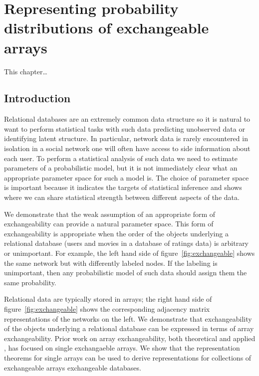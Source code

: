 
\inbpdocument

\chapter{Representing probability distributions of exchangeable arrays}
\label{ch:arrays}

This chapter\dots

\section{Introduction}

Relational databases are an extremely common data structure so it is natural to want to perform statistical tasks with such data \eg predicting unobserved data or identifying latent structure.
In particular, network data is rarely encountered in isolation \eg in a social network one will often have access to side information about each user.
To perform a statistical analysis of such data we need to estimate parameters of a probabilistic model, but it is not immediately clear what an appropriate parameter space for such a model is.
The choice of parameter space is important because it indicates the targets of statistical inference and shows where we can share statistical strength between different aspects of the data.

We demonstrate that the weak assumption of an appropriate form of exchangeability can provide a natural parameter space.
This form of exchangeability is appropriate when the order of the objects underlying a relational database (\eg users and movies in a database of ratings data) is arbitrary or unimportant.
For example, the left hand side of figure~\ref{fig:exchangeable} shows the same network but with differently labeled nodes.
If the labeling is unimportant, then any probabilistic model of such data should assign them the same probability.

\newpage
Relational data are typically stored in arrays; the right hand side of figure~\ref{fig:exchangeable} shows the corresponding adjacency matrix representations of the networks on the left.
We demonstrate that exchangeability of the objects underlying a relational database can be expressed in terms of array exchangeability.
Prior work on array exchangeability, both theoretical \citep[e.g.][]{Hoover1979, Aldous1981a, Hoover1982, Kallenberg1999a, Diaconis2007, Aldous2010, Austin2012, Choi2012, Wolfe2013} and applied \citep[e.g.][]{Hoff2007a,Roy2009,Lloyd2012}, has focused on single exchangaeble arrays.
We show that the representation theorems for single arrays can be used to derive representations for collections of exchangeable arrays \ie exchangeable databases.

